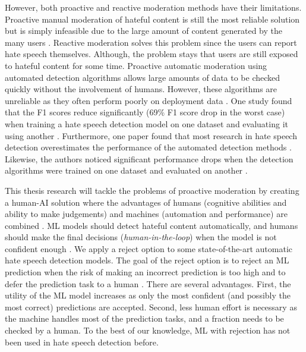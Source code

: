 %
However, both proactive and reactive moderation methods have their limitations.
%
Proactive manual moderation of hateful content is still the most reliable solution but is simply infeasible due to the large amount of content generated by the many users \citep{balayn2021automatic}.
%
Reactive moderation solves this problem since the users can report hate speech themselves.
%
Although, the problem stays that users are still exposed to hateful content for some time.
%
Proactive automatic moderation using automated detection algorithms allows large amounts of data to be checked quickly without the involvement of humans.
%
However, these algorithms are unreliable as they often perform poorly on deployment data \citep{balayn2021automatic, grondahl2018all, arango2019hate}.
%
One study found that the F1 scores reduce significantly (69\% F1 score drop in the worst case) when training a hate speech detection model on one dataset and evaluating it using another \citep{grondahl2018all}.
%
Furthermore, one paper found that most research in hate speech detection overestimates the performance of the automated detection methods \citep{arango2019hate}.
%
Likewise, the authors noticed significant performance drops when the detection algorithms were trained on one dataset and evaluated on another \citep{arango2019hate}.
%

%
This thesis research will tackle the problems of proactive moderation by creating a human-AI solution where the advantages of humans (cognitive abilities and ability to make judgements) and machines (automation and performance) are combined \citep{woo2020future}.
%
%
ML models should detect hateful content automatically, and humans should make the final decisions (\textit{human-in-the-loop}) when the model is not confident enough \citep{woo2020future}.
%
%
We apply a reject option to some state-of-the-art automatic hate speech detection models.
%
The goal of the reject option is to reject an ML prediction when the risk of making an incorrect prediction is too high and to defer the prediction task to a human \citep{hendrickx2021machine}.
%
There are several advantages.
%
First, the utility of the ML model increases as only the most confident (and possibly the most correct) predictions are accepted.
%
Second, less human effort is necessary as the machine handles most of the prediction tasks, and a fraction needs to be checked by a human.
%
To the best of our knowledge, ML with rejection has not been used in hate speech detection before.
%


